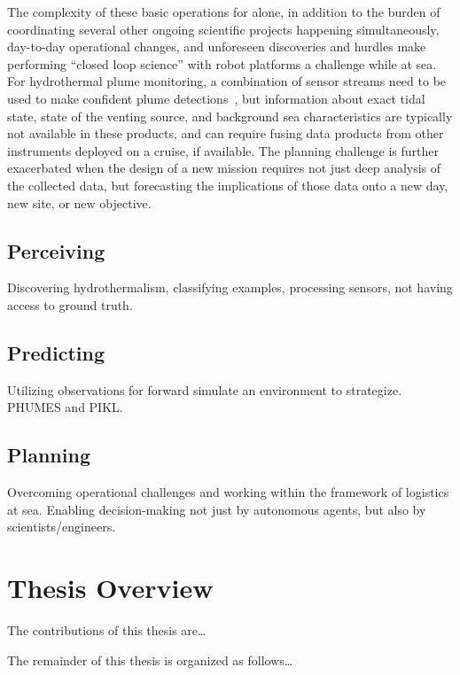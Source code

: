 The complexity of these basic operations for \Sentry alone, in addition to the burden of coordinating several other ongoing scientific projects happening simultaneously, day-to-day operational changes, and unforeseen discoveries and hurdles make performing ``closed loop science'' with robot platforms a challenge while at sea. For hydrothermal plume monitoring, a combination of sensor streams need to be used to make confident plume detections~\autocite{jakuba2007stochastic}, but information about exact tidal state, state of the venting source, and background sea characteristics are typically not available in these products, and can require fusing data products from other instruments deployed on a cruise, if available. The planning challenge is further exacerbated when the design of a new mission requires not just deep analysis of the collected data, but forecasting the implications of those data onto a new day, new site, or new objective. 


\subsection{Perceiving}
Discovering hydrothermalism, classifying examples, processing sensors, not having access to ground truth.

\subsection{Predicting}
Utilizing observations for forward simulate an environment to strategize. PHUMES and PIKL.

\subsection{Planning}
Overcoming operational challenges and working within the framework of logistics at sea. Enabling decision-making not just by autonomous agents, but also by scientists/engineers.

\section{Thesis Overview}
The contributions of this thesis are\dots

The remainder of this thesis is organized as follows\dots